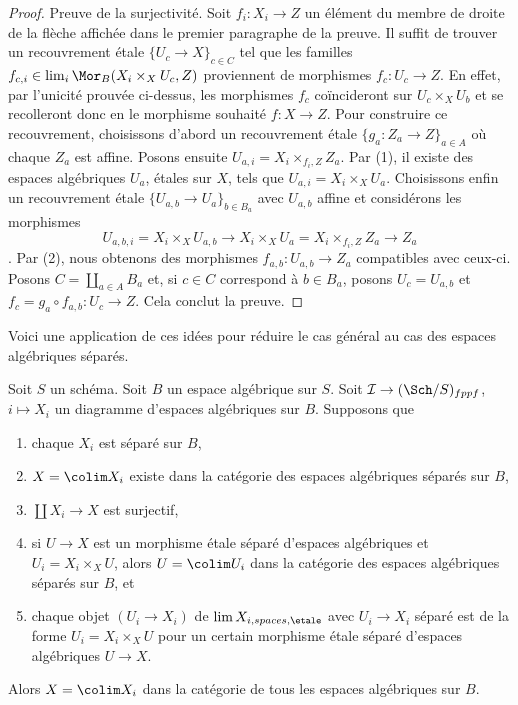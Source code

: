 \begin{proof}
\medskip\noindent
Preuve de la surjectivité. Soit $f_i : X_i \to Z$ un élément du membre de droite de la flèche affichée dans le premier paragraphe de la preuve. Il suffit de trouver un recouvrement \'etale $\{U_c \to X\}_{c \in C}$ tel que les familles $f_{c, i} \in \lim_i \Mor_B(X_i \times_X U_c, Z)$ proviennent de morphismes $f_c : U_c \to Z$. En effet, par l'unicité prouvée ci-dessus, les morphismes $f_c$ coïncideront sur $U_c \times_X U_b$ et se recolleront donc en le morphisme souhaité $f : X \to Z$. Pour construire ce recouvrement, choisissons d'abord un recouvrement \'etale $\{g_a : Z_a \to Z\}_{a \in A}$ où chaque $Z_a$ est affine. Posons ensuite $U_{a, i} = X_i \times_{f_i, Z} Z_a$. Par (1), il existe des espaces algébriques $U_a$, \'etales sur $X$, tels que $U_{a, i} = X_i \times_X U_a$. Choisissons enfin un recouvrement \'etale $\{U_{a, b} \to U_a\}_{b \in B_a}$ avec $U_{a, b}$ affine et considérons les morphismes $$
U_{a, b, i} = X_i \times_X U_{a, b} \to
X_i \times_X U_a = X_i \times_{f_i, Z} Z_a \to Z_a
$$. Par (2), nous obtenons des morphismes $f_{a, b} : U_{a, b} \to Z_a$ compatibles avec ceux-ci. Posons $C = \coprod_{a \in A} B_a$ et, si $c \in C$ correspond à $b \in B_a$, posons $U_c = U_{a, b}$ et $f_c = g_a \circ f_{a, b} : U_c \to Z$. Cela conclut la preuve.
\end{proof}

\noindent
Voici une application de ces idées pour réduire le cas général au cas des espaces algébriques séparés.

\begin{lemma}
\label{lemma-colimit-separated-enough}
Soit $S$ un schéma. Soit $B$ un espace algébrique sur $S$.
Soit $\mathcal{I} \to (\Sch/S)_{fppf}$, $i \mapsto X_i$
un diagramme d'espaces algébriques sur $B$. Supposons que
\begin{enumerate}
\item chaque $X_i$ est séparé sur $B$,
\item $X = \colim X_i$ existe dans la catégorie des
espaces algébriques séparés sur $B$,
\item $\coprod X_i \to X$ est surjectif,
\item si $U \to X$ est un morphisme \'etale séparé d'espaces algébriques et
$U_i = X_i \times_X U$, alors $U = \colim U_i$ dans
la catégorie des espaces algébriques séparés sur $B$, et
\item chaque objet $(U_i \to X_i)$ de $\lim X_{i, spaces, \etale}$
avec $U_i \to X_i$ séparé est de la forme $U_i = X_i \times_X U$
pour un certain morphisme \'etale séparé d'espaces algébriques $U \to X$.
\end{enumerate}
Alors $X = \colim X_i$ dans la catégorie de tous les espaces algébriques sur $B$.
\end{lemma}

